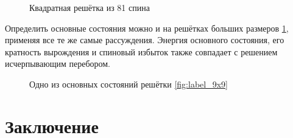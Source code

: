 \documentclass[utf8, babel, sor, jor, amsmath, amssymb, reprint]{elsarticle} %
\begin{document}
\begin{figure}[h]
	\centering
	\caption{Квадратная решётка из 81 спина}
	\label{fig:label_9x9}
\end{figure}



Определить основные состояния можно и на решётках больших размеров \ref{fig:label_9x9}, применяя все те же самые рассуждения. Энергия основного состояния, его кратность вырождения и спиновый избыток также совпадает с решением исчерпывающим перебором.

\begin{figure}[h]
	\centering
	\caption{Одно из основных состояний решётки \eqref{fig:label_9x9}}
	\label{fig:label_9x9_gs_1}
\end{figure}


\section{Заключение}
\end{document}
